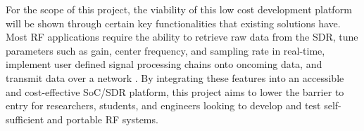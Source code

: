 \documentclass[conference]{IEEEtran}
\begin{document}
For the scope of this project, the viability of this low cost development platform will be shown through certain key functionalities that existing solutions have.
Most RF applications require the ability to retrieve raw data from the SDR, tune parameters such as gain, center frequency, and sampling rate in real-time, 
implement user defined signal processing chains onto oncoming data, and transmit data over a network \cite{10880410, 9721283}. By integrating these features into an accessible and cost-effective SoC/SDR platform, 
this project aims to lower the barrier to entry for researchers, students, and engineers looking to develop and test self-sufficient and portable RF systems.

\nocite{*}

\end{document}
